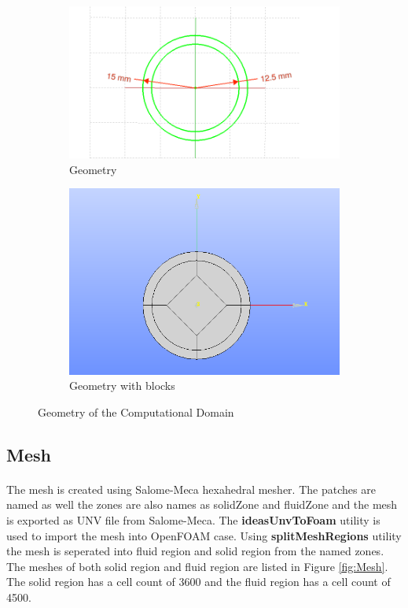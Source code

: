 \documentclass{article}
\begin{document}
    \begin{figure}[ht]
        \centering
        \begin{subfigure}[b]{0.4\linewidth}
            \includegraphics[width=\linewidth]{drawing.png}
            \caption{Geometry}
        \end{subfigure}
        \begin{subfigure}[b]{0.4\linewidth}
            \includegraphics[width=\linewidth]{geometry.png}
            \caption{Geometry with blocks}
        \end{subfigure}
        \caption{Geometry of the Computational Domain}
        \label{fig:Geometry}
    \end{figure}

    \subsection{Mesh}
    \paragraph*{}
    The mesh is created using Salome-Meca hexahedral mesher. The patches are named as well the zones are also names as solidZone and fluidZone and the mesh is exported as UNV file from Salome-Meca. The \textbf{ideasUnvToFoam} utility is used to import the mesh into OpenFOAM case. Using \textbf{splitMeshRegions} utility the mesh is seperated into fluid region and solid region from the named zones. The meshes of both solid region and fluid region are listed in Figure \ref{fig:Mesh}. The solid region has a cell count of 3600 and the fluid region has a cell count of 4500.
    
\end{document}

